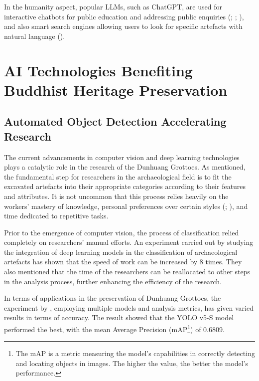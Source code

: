 In the humanity aspect, popular LLMs, such as ChatGPT, are used for interactive chatbots for public education
and addressing public enquiries (; ;
), and also smart search engines allowing users to look for specific
artefacts with natural language ().

\section{AI Technologies Benefiting Buddhist Heritage Preservation}

\subsection{Automated Object Detection Accelerating Research}
\label{sec:automated-object-detection}

The current advancements in computer vision and deep learning technologies plays a catalytic role in the research
of the Dunhuang Grottoes. As  mentioned, the fundamental step
for researchers in the archaeological field is to fit the excavated artefacts into their appropriate categories
according to their features and attributes. It is not uncommon that this process relies heavily on the workers'
mastery of knowledge, personal preferences over certain styles (;
), and time dedicated to repetitive tasks.

Prior to the emergence of computer vision, the process of classification relied completely on researchers'
manual efforts. An experiment carried out by  studying
the integration of deep learning models in the classification of archaeological artefacts has shown that
the speed of work can be increased by 8 times. They also mentioned that the time of the researchers can be
reallocated to other steps in the analysis process, further enhancing the efficiency of the research.

In terms of applications in the preservation of Dunhuang Grottoes, the experiment by
, employing multiple models and analysis metrics, has given varied results
in terms of accuracy. The result showed that the YOLO v5-S model performed the best, with the
mean Average Precision (mAP\footnote{
    The mAP is a metric measuring the model's capabilities in correctly detecting and locating objects in images.
    The higher the value, the better the model's performance.
}) of 0.6809.

